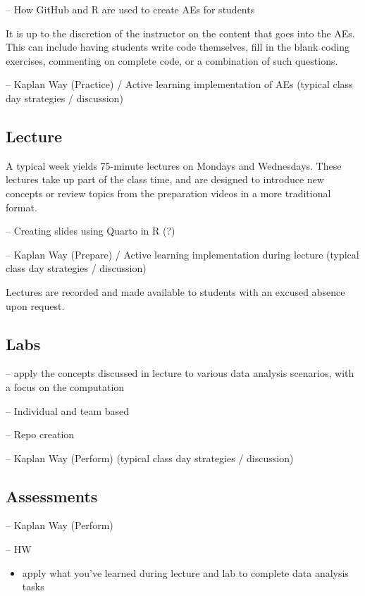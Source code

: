 \documentclass[
  12pt]{article}
\providecommand{\tightlist}{%
  \setlength{\itemsep}{0pt}\setlength{\parskip}{0pt}}\usepackage{longtable,booktabs,array}
\begin{document}
-- How GitHub and R are used to create AEs for students

It is up to the discretion of the instructor on the content that goes
into the AEs. This can include having students write code themselves,
fill in the blank coding exercises, commenting on complete code, or a
combination of such questions.

-- Kaplan Way (Practice) / Active learning implementation of AEs
(typical class day strategies / discussion)

\hypertarget{lecture}{%
\subsection{Lecture}\label{lecture}}

A typical week yields 75-minute lectures on Mondays and Wednesdays.
These lectures take up part of the class time, and are designed to
introduce new concepts or review topics from the preparation videos in a
more traditional format.

-- Creating slides using Quarto in R (?)

-- Kaplan Way (Prepare) / Active learning implementation during lecture
(typical class day strategies / discussion)

Lectures are recorded and made available to students with an excused
absence upon request.

\hypertarget{labs}{%
\subsection{Labs}\label{labs}}

-- apply the concepts discussed in lecture to various data analysis
scenarios, with a focus on the computation

-- Individual and team based

-- Repo creation

-- Kaplan Way (Perform) (typical class day strategies / discussion)

\hypertarget{assessments}{%
\subsection{Assessments}\label{assessments}}

-- Kaplan Way (Perform)

-- HW

\begin{itemize}
\tightlist
\item
  apply what you've learned during lecture and lab to complete data
  analysis tasks
\end{itemize}
\end{document}
